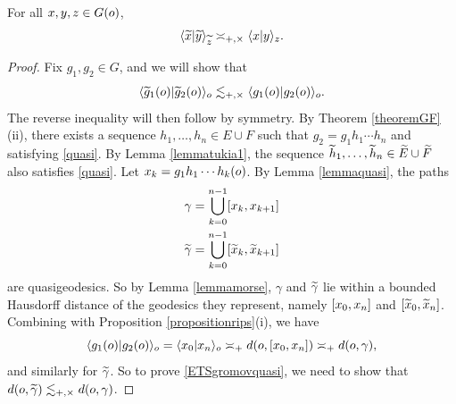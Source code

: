 {\begin{lemma}
\label{lemmagromovquasi}
For all $x,y,z\in G(o)$,
\[
\langle \widetilde x | \widetilde y\rangle_{\widetilde z} \asymp_{+,\times} \langle x | y \rangle_z.
\]
\end{lemma}
\begin{proof}
Fix $g_1,g_2\in G$, and we will show that
\begin{equation}
\label{ETSgromovquasi}
\langle \widetilde g_1(o) | \widetilde g_2(o)\rangle_o \lesssim_{+,\times} \langle g_1(o) | g_2(o)\rangle_o.
\end{equation}
The reverse inequality will then follow by symmetry. By Theorem \ref{theoremGF}(ii), there exists a sequence $h_1,\ldots,h_n\in E\cup F$ such that $g_2 = g_1 h_1\cdots h_n$ and satisfying \eqref{quasi}. By Lemma \ref{lemmatukia1}, the sequence $\widetilde h_1,\ldots,\widetilde h_n\in \widetilde E\cup \widetilde F$ also satisfies \eqref{quasi}. Let $x_k = g_1 h_1 \cdots h_k(o)$. By Lemma \ref{lemmaquasi}, the paths
\begin{align*}
\gamma &= \bigcup_{k = 0}^{n - 1} [x_k,x_{k + 1}]\\
\widetilde\gamma &= \bigcup_{k = 0}^{n - 1} [\widetilde x_k,\widetilde x_{k + 1}]
\end{align*}
are quasigeodesics. So by Lemma \ref{lemmamorse}, $\gamma$ and $\widetilde\gamma$ lie within a bounded Hausdorff distance of the geodesics they represent, namely $[x_0,x_n]$ and $[\widetilde x_0,\widetilde x_n]$. Combining with Proposition \ref{propositionrips}(i), we have
\[
\langle g_1(o) | g_2(o)\rangle_o = \langle x_0 | x_n \rangle_o \asymp_+ d(o,[x_0,x_n]) \asymp_+ d(o,\gamma),
\]
and similarly for $\widetilde\gamma$. So to prove \eqref{ETSgromovquasi}, we need to show that $d(o,\widetilde\gamma) \lesssim_{+,\times} d(o,\gamma)$.


\end{proof}}
